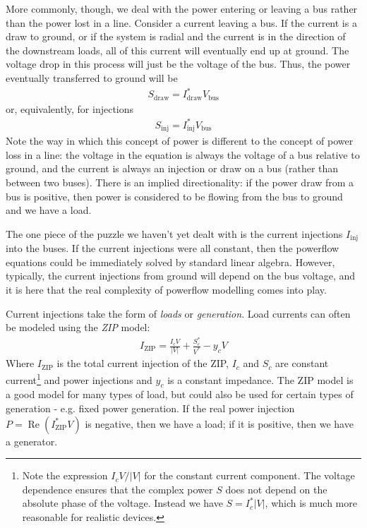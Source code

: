 \documentclass[10pt]{article}
\newcommand{\re}[1]{\ensuremath{\operatorname{Re}(#1)}}
\begin{document}
More commonly, though, we deal with the power entering or leaving a bus rather than the power lost in a line. Consider a current leaving a bus. If the current is a draw to ground, or if the system is radial and the current is in the direction of the downstream loads, all of this current will eventually end up at ground. The voltage drop in this process will just be the voltage of the bus. Thus, the power eventually transferred to ground will be 
\begin{align}
	S_\text{draw} = I_\text{draw}^*V_\text{bus}
\end{align}
or, equivalently, for injections
\begin{align}
	S_\text{inj} = I_\text{inj}^*V_\text{bus}
\end{align}
Note the way in which this concept of power is different to the concept of power loss in a line: the voltage in the equation is always the voltage of a bus relative to ground, and the current is always an injection or draw on a bus (rather than between two buses). There is an implied directionality: if the power draw from a bus is positive, then power is considered to be flowing from the bus to ground and we have a load.

The one piece of the puzzle we haven't yet dealt with is the current injections $I_\text{inj}$ into the buses. If the current injections were all constant, then the powerflow equations could be immediately solved by standard linear algebra. However, typically, the current injections from ground will depend on the bus voltage, and it is here that the real complexity of powerflow modelling comes into play.

Current injections take the form of \emph{loads} or \emph{generation}. Load currents can often be modeled using the \emph{ZIP} model:
\begin{align}
	I_\text{ZIP} = \frac{I_cV}{|V|} + \frac{S^*_c}{V^*} - y_cV
\end{align}
Where $I_\text{ZIP}$ is the total current injection of the ZIP, $I_c$ and $S_c$ are constant current\footnote{Note the expression $I_cV/|V|$ for the constant current component. The voltage dependence ensures that the complex power $S$ does not depend on the absolute phase of the voltage. Instead we have $S = I^*_c |V|$, which is much more reasonable for realistic devices.} and power injections and $y_c$ is a constant impedance. The ZIP model is a good model for many types of load, but could also be used for certain types of generation - e.g. fixed power generation. If the real power injection $P = \re{I_\text{ZIP}^*V}$ is negative, then we have a load; if it is positive, then we have a generator.
\end{document}
